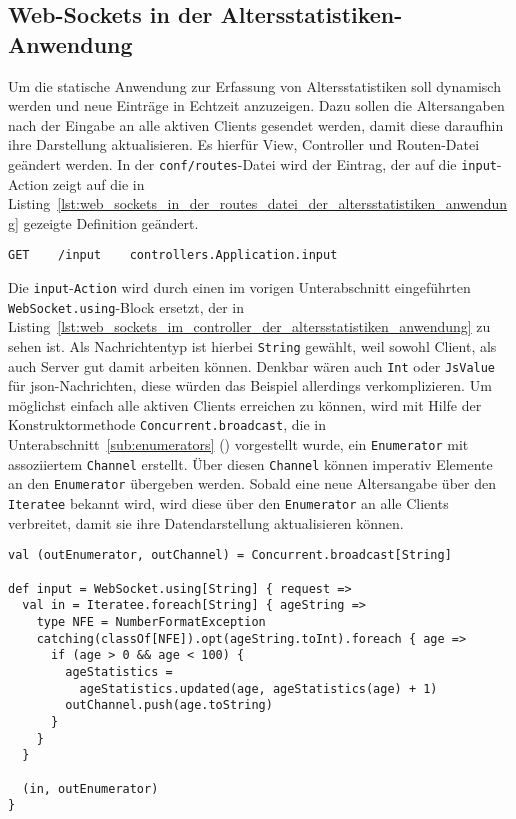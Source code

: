 
\subsection{Web-Sockets in der Altersstatistiken-Anwendung} %
\label{sub:web_sockets_in_der_altersstatistiken_anwendung}

Um die statische Anwendung zur Erfassung von Altersstatistiken soll dynamisch werden und neue Einträge in Echtzeit anzuzeigen.
Dazu sollen die Altersangaben nach der Eingabe an alle aktiven Clients gesendet werden, damit diese daraufhin ihre Darstellung aktualisieren.
Es hierfür View, Controller und Routen-Datei geändert werden.
In der \lstinline|conf/routes|-Datei wird der Eintrag, der auf die \lstinline|input|-Action zeigt auf die in Listing~\ref{lst:web_sockets_in_der_routes_datei_der_altersstatistiken_anwendung} gezeigte Definition geändert.

\begin{lstlisting}[caption=Web-Sockets in der routes-Datei der Altersstatistiken-Anwendung, label=lst:web_sockets_in_der_routes_datei_der_altersstatistiken_anwendung]
GET    /input    controllers.Application.input
\end{lstlisting}

Die \lstinline|input|-\lstinline|Action| wird durch einen im vorigen Unterabschnitt eingeführten \lstinline|WebSocket.using|-Block ersetzt, der in Listing~\ref{lst:web_sockets_im_controller_der_altersstatistiken_anwendung} zu sehen ist.
Als Nachrichtentyp ist hierbei \lstinline|String| gewählt, weil sowohl Client, als auch Server gut damit arbeiten können.
Denkbar wären auch \lstinline|Int| oder \lstinline|JsValue| für \gls{json}-Nachrichten, diese würden das Beispiel allerdings verkomplizieren.
Um möglichst einfach alle aktiven Clients erreichen zu können, wird mit Hilfe der Konstruktormethode \lstinline|Concurrent.broadcast|, die in Unterabschnitt~\ref{sub:enumerators} () vorgestellt wurde, ein \lstinline|Enumerator| mit assoziiertem \lstinline|Channel| erstellt.
Über diesen \lstinline|Channel| können imperativ Elemente an den \lstinline|Enumerator| übergeben werden.
Sobald eine neue Altersangabe über den \lstinline|Iteratee| bekannt wird, wird diese über den \lstinline|Enumerator| an alle Clients verbreitet, damit sie ihre Datendarstellung aktualisieren können.

\begin{lstlisting}[caption=Web-Sockets im Controller der Altersstatistiken-Anwendung, label=lst:web_sockets_im_controller_der_altersstatistiken_anwendung]
val (outEnumerator, outChannel) = Concurrent.broadcast[String]

def input = WebSocket.using[String] { request =>
  val in = Iteratee.foreach[String] { ageString =>
    type NFE = NumberFormatException
    catching(classOf[NFE]).opt(ageString.toInt).foreach { age =>
      if (age > 0 && age < 100) {
        ageStatistics =
          ageStatistics.updated(age, ageStatistics(age) + 1)
        outChannel.push(age.toString)
      }
    }
  }

  (in, outEnumerator)
}
\end{lstlisting}

